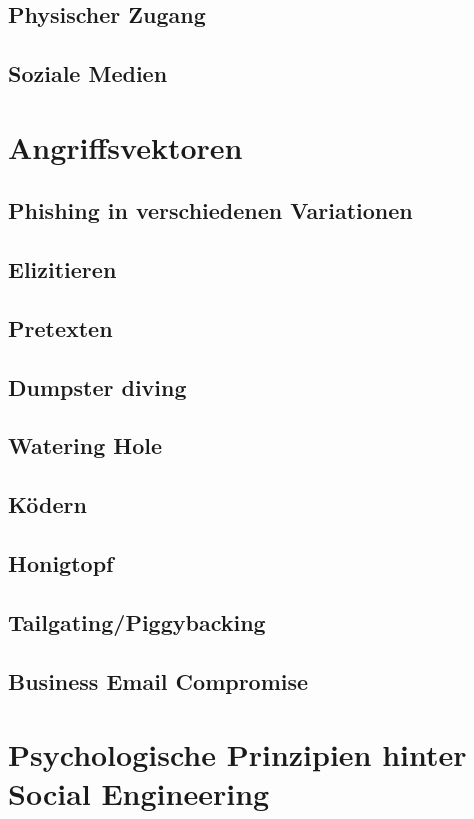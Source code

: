 \subsection{Physischer Zugang}
\subsection{Soziale Medien}
\section{Angriffsvektoren}

\subsection{Phishing in verschiedenen Variationen}
\subsection{Elizitieren}
\subsection{Pretexten}
\subsection{Dumpster diving}
\subsection{Watering Hole}
\subsection{Ködern}
\subsection{Honigtopf}
\subsection{Tailgating/Piggybacking}
\subsection{Business Email Compromise}

\section{Psychologische Prinzipien hinter Social Engineering}

